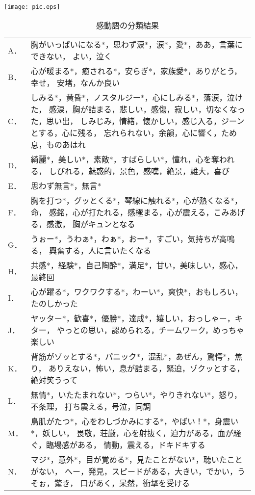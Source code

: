 \documentclass[japanese]{jnlp_1.3c}
\begin{document}
\begin{table}[t]
\begin{center}
\caption{感動語の分類結果}
\texttt{[image: pic.eps]}
\par\vspace{1\baselineskip}
\begin{tabular*}{142mm}{p{6mm}p{128mm}}
A．& 胸がいっぱいになる*，思わず涙*，涙*，愛*，ああ，言葉にできない，
      よい，泣く \\
B．& 心が暖まる*，癒される*，安らぎ*，家族愛*，ありがとう，幸せ，
      安堵，なんか良い \\
C．& しみる*，黄昏*，ノスタルジー*，心にしみる*，落涙，泣けた，
      感涙，胸が詰まる，悲しい，感傷，寂しい，切なくなった，思い出，
      しみじみ，情緒，懐かしい，感じ入る，ジーンとする，心に残る，
      忘れられない，余韻，心に響く，ため息，ものあはれ \\
D．& 綺麗*，美しい*，素敵*，すばらしい*，憧れ，心を奪われる，
      しびれる，魅惑的，景色，感嘆，絶景，雄大，喜び \\
E．& 思わず無言*，無言* \\
F．& 胸を打つ*，グッとくる*，琴線に触れる*，心が熱くなる*，命，
      感銘，心が打たれる，感極まる，心が震える，こみあげる，感激，
      胸がキュンとなる \\
G．& うぉー*，うわぁ*，わぁ*，おー*，すごい，気持ちが高鳴る，
      興奮する，人に言いたくなる \\
H．& 共感*，経験*，自己陶酔*，満足*，甘い，美味しい，感心，最終回 \\
I．& 心が躍る*，ワクワクする*，わーい*，爽快*，おもしろい，たのしかった \\
J．& ヤッター*，歓喜*，優勝*，達成*，嬉しい，おっしゃー，キター，
      やっとの思い，認められる，チームワーク，めっちゃ楽しい \\
K．& 背筋がゾッとする*，パニック*，混乱*，あぜん，驚愕*，焦り，
      ありえない，怖い，息が詰まる，緊迫，ゾクッとする，絶対笑うって \\
L．& 無情*，いたたまれない*，つらい*，やりきれない*，怒り，不条理，
      打ち震える，号泣，同調 \\
M．& 鳥肌がたつ*，心をわしづかみにする*，やばい！*，身震い*，妖しい，
      畏敬，荘厳，心を射抜く，迫力がある，血が騒ぐ，臨場感がある，
      情動，震える，ドキドキする \\
N．& マジ*，意外*，目が覚める*，見たことがない*，聴いたことがない，
      へー，発見，スピードがある，大きい，でかい，うそぉ，驚き，
      口があく，呆然，衝撃を受ける \\
\end{tabular*}                      
\end{center}
\end{table}
\end{document}
